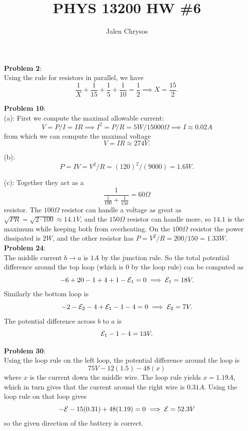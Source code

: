 \documentclass{amsart}
\title{PHYS 13200 HW \#6}
\author{Jalen Chrysos}
\begin{document}
	\maketitle
	\textbf{Problem 2}:\\
	
	Using the rule for resistors in parallel, we have
	$$
	\frac{1}{X} + \frac{1}{15} + \frac{1}{5} + \frac{1}{10} = \frac{1}{2} \implies X = \frac{15}{2}.
	$$
	
	\textbf{Problem 10}:\\
	
	(a): First we compute the maximal allowable current:
	$$V=P/I = IR \implies I^2 = P/R = 5 W/15000 \Omega \implies I \approx 0.02 A$$
	from which we can compute the maximal voltage
	$$
	V = IR \approx 274 V.
	$$
	
	(b): 
	$$
	P = IV = V^2/R = (120)^2/(9000) = 1.6 W.
	$$
	
	(c): Together they act as a 
	$$
	\frac{1}{\frac{1}{100}+\frac{1}{150}} = 60 \Omega 
	$$
	resistor. The $100\Omega$ resistor can handle a voltage as great as $\sqrt{PR} = \sqrt{2\cdot 100} \approx 14.1 V$, and the $150\Omega$ resistor can handle more, so $14.1$ is the maximum while keeping both from overheating. On the $100\Omega$ resistor the power dissipated is $2W$, and the other resistor has $P= V^2/R = 200/150 = 1.33 W$.\\
	
	\textbf{Problem 24}:\\
	
	The middle current $b\to a$ is $1A$ by the junction rule. So the total potential difference around the top loop (which is 0 by the loop rule) can be computed as
	$$
	-6 + 20 - 1 + 4 + 1 - \mathcal{E}_1 = 0 \implies \mathcal{E}_1 = 18 V.
	$$
	Similarly the bottom loop is
	$$
	-2 - \mathcal{E}_2 - 4 + \mathcal{E}_1 - 1 - 4 = 0 \implies \mathcal{E}_2 = 7 V.
	$$
	The potential difference across $b$ to $a$ is 
	$$
	\mathcal{E}_1 - 1 - 4 = 13 V.
	$$
	
	\textbf{Problem 30}:\\
	
	Using the loop rule on the left loop, the potential difference around the loop is 
	$$
	75V - 12(1.5) - 48(x)
	$$
	where $x$ is the current down the middle wire. The loop rule yields $x=1.19A$, which in turn gives that the current around the right wire is $0.31 A$. Using the loop rule on that loop gives
	$$
	-\mathcal{E} - 15(0.31) + 48(1.19) = 0 \implies \mathcal{E} = 52.3 V
	$$
	so the given direction of the battery is correct.\\
	
\end{document}
